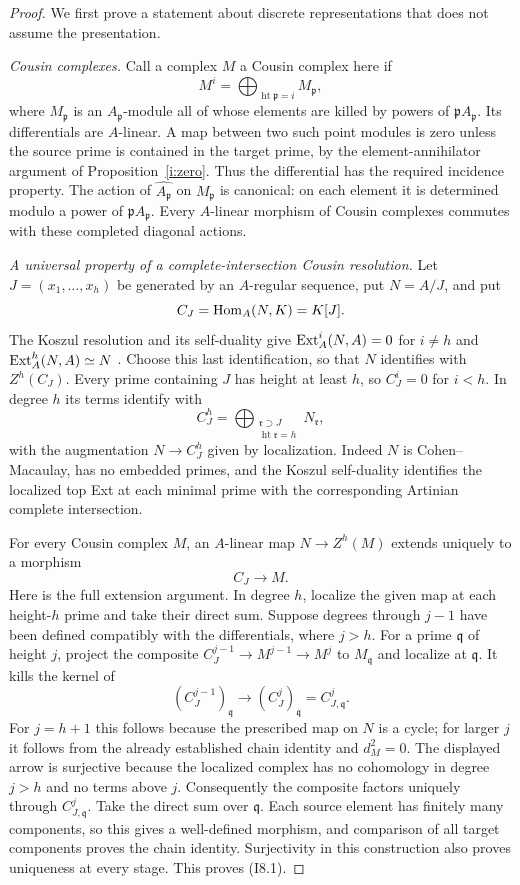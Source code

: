 \begin{proof}
We first prove a statement about discrete representations that does
not assume the presentation.

\emph{Cousin complexes.}
Call a complex $M$ a Cousin complex here if
\[
 M^i=\bigoplus_{\operatorname{ht}\mathfrak p=i}M_{\mathfrak p},
\]
where $M_{\mathfrak p}$ is an $A_{\mathfrak p}$-module all of whose
elements are killed by powers of $\mathfrak pA_{\mathfrak p}$.
Its differentials are $A$-linear. A map between two such point
modules is zero unless the source prime is contained in the target
prime, by the element-annihilator argument of
Proposition~\ref{i:zero}. Thus the differential has the required
incidence property. The action of
$\widehat{A_{\mathfrak p}}$ on $M_{\mathfrak p}$ is canonical:
on each element it is determined modulo a power of
$\mathfrak pA_{\mathfrak p}$. Every $A$-linear morphism of Cousin
complexes commutes with these completed diagonal actions.

\emph{A universal property of a complete-intersection Cousin
resolution.}
Let $J=(x_1,\ldots,x_h)$ be generated by an $A$-regular sequence,
put $N=A/J$, and put
\[
 C_J=\operatorname{Hom}_A(N,K)=K[J].
\]
The Koszul resolution and its self-duality give
$\operatorname{Ext}_A^i(N,A)=0$ for $i\ne h$ and
$\operatorname{Ext}_A^h(N,A)\simeq N$
\cite[Lemma 48.15.5, tag 0BQZ]{StacksKoszulDuality}.
Choose this last identification, so that
$N$ identifies with $Z^h(C_J)$. Every prime containing $J$ has
height at least $h$, so $C_J^i=0$ for $i<h$. In degree $h$ its
terms identify with
\[
 C_J^h=\bigoplus_{\substack{\mathfrak r\supset J\\
                            \operatorname{ht}\mathfrak r=h}}
 N_{\mathfrak r},
\]
with the augmentation $N\to C_J^h$ given by localization.
Indeed $N$ is Cohen--Macaulay, has no embedded primes, and the
Koszul self-duality identifies the localized top Ext at each
minimal prime with the corresponding Artinian complete intersection.

For every Cousin complex $M$, an $A$-linear map
$N\to Z^h(M)$ extends uniquely to a morphism
\[
                         C_J\longrightarrow M.          \tag{I8.1}
\]
Here is the full extension argument. In degree $h$, localize the
given map at each height-$h$ prime and take their direct sum. Suppose
degrees through $j-1$ have been defined compatibly with the
differentials, where $j>h$. For a prime $\mathfrak q$ of height
$j$, project the composite
$C_J^{j-1}\to M^{j-1}\to M^j$ to $M_{\mathfrak q}$ and
localize at $\mathfrak q$. It kills the kernel of
\[
 (C_J^{j-1})_{\mathfrak q}\longrightarrow
 (C_J^j)_{\mathfrak q}=C_{J,\mathfrak q}^j.
\]
For $j=h+1$ this follows because the prescribed map on $N$ is a
cycle; for larger $j$ it follows from the already established chain
identity and $d_M^2=0$. The displayed arrow is surjective because
the localized complex has no cohomology in degree $j>h$ and no
terms above $j$. Consequently the composite factors uniquely
through $C_{J,\mathfrak q}^j$. Take the direct sum over
$\mathfrak q$. Each source element has finitely many components,
so this gives a well-defined morphism, and comparison of all target
components proves the chain identity. Surjectivity in this
construction also proves uniqueness at every stage. This proves
(I8.1).


\end{proof}
